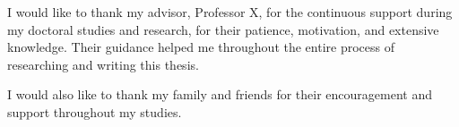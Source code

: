 I would like to thank my advisor, Professor X, for the continuous support during my doctoral studies and research, for their patience, motivation, and extensive knowledge. Their guidance helped me throughout the entire process of researching and writing this thesis.

I would also like to thank my family and friends for their encouragement and support throughout my studies.

